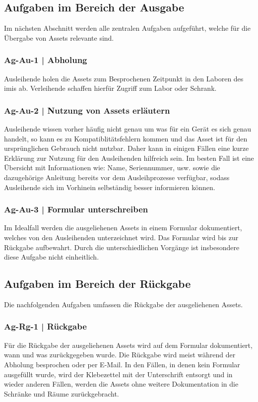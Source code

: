 \subsection{Aufgaben im Bereich der Ausgabe}
Im nächsten Abschnitt werden alle zentralen Aufgaben aufgeführt, welche für die Übergabe von
Assets relevante sind.
\subsubsection{Ag-Au-1 | Abholung}
Ausleihende holen die Assets zum Besprochenen Zeitpunkt in den Laboren des \ac{imis} ab. Verleihende
schaffen hierfür Zugriff zum Labor oder Schrank. 
\subsubsection{Ag-Au-2 | Nutzung von Assets erläutern}
Ausleihende wissen vorher häufig nicht genau um was für ein Gerät es sich genau handelt, so kann es
zu Kompatiblitätsfehlern kommen und das Asset ist für den ursprünglichen Gebrauch nicht nutzbar.
Daher kann in einigen Fällen eine kurze Erklärung zur Nutzung für den Ausleihenden hilfreich sein.
Im besten Fall ist eine Übersicht mit Informationen wie: Name, Seriennummer, usw. sowie die
dazugehörige Anleitung bereits vor dem Ausleihprozesse verfügbar, sodass Ausleihende sich im
Vorhinein selbständig besser informieren können.
\subsubsection{Ag-Au-3 | Formular unterschreiben}
Im Idealfall werden die ausgeliehenen Assets in einem Formular dokumentiert, welches von den
Ausleihenden unterzeichnet wird. Das Formular wird bis zur Rückgabe aufbewahrt. Durch die
unterschiedlichen Vorgänge ist insbesondere diese Aufgabe nicht einheitlich.

\subsection{Aufgaben im Bereich der Rückgabe}
Die nachfolgenden Aufgaben umfassen die Rückgabe der ausgeliehenen Assets. 

\subsubsection{Ag-Rg-1 | Rückgabe}
Für die Rückgabe der ausgeliehenen Assets wird auf dem Formular dokumentiert, wann und was
zurückgegeben wurde. Die Rückgabe wird meist während der Abholung besprochen oder per E-Mail. In den
Fällen, in denen kein Formular ausgefüllt wurde, wird der Klebezettel mit der Unterschrift entsorgt
und in wieder anderen Fällen, werden die Assets ohne weitere Dokumentation in die Schränke und Räume
zurückgebracht.
